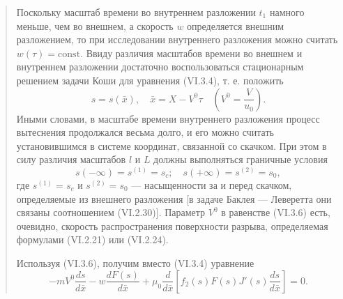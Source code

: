 \documentclass[12pt,a4paper]{article}
\begin{document}
\begin{quote}\sloppy
Поскольку масштаб времени во внутреннем разложении $t_1$ намного меньше, чем во внешнем, а скорость $w$ определяется внешним разложением, то при исследовании внутреннего разложения можно считать $w(\tau)=\mathrm{const}$. Ввиду различия масштабов времени во внешнем и внутреннем разложении достаточно воспользоваться стационарным решением задачи Коши для уравнения (VI.3.4), т. е. положить
\begin{equation}s=s(\bar x),\quad\bar x=X-V^0\tau\quad\left(V^0=\frac{V}{u_0}\right).\tag{VI.3.6}\label{q12:eq-VI-3-6}\end{equation}
Иными словами, в масштабе времени внутреннего разложения процесс вытеснения продолжался весьма долго, и его можно считать установившимся в системе координат, связанной со скачком. При этом в силу различия масштабов $l$ и $L$ должны выполняться граничные условия
\begin{equation}s(-\infty)=s^{(1)}=s_c;\quad s(+\infty)=s^{(2)}=s_0,\tag{VI.3.7}\label{q12:eq-VI-3-7}\end{equation}
где $s^{(1)}=s_c$ и $s^{(2)}=s_0$ --- насыщенности за и перед скачком, определяемые из внешнего разложения [в задаче Баклея --- Леверетта они связаны соотношением (VI.2.30)]. Параметр $V^0$ в равенстве (VI.3.6) есть, очевидно, скорость распространения поверхности разрыва, определяемая формулами (VI.2.21) или (VI.2.24).

Используя (VI.3.6), получим вместо (VI.3.4) уравнение
\begin{equation}-mV^0\frac{ds}{d\bar x}-w\frac{dF(s)}{d\bar x}+\mu_0\frac{d}{d\bar x}\left[f_2(s)F(s)J'(s)\frac{ds}{d\bar x}\right]=0.\tag{VI.3.8}\label{q12:eq-VI-3-8}\end{equation}

\par\nobreak{}\par
\end{quote}
\endgroup
\end{document}
